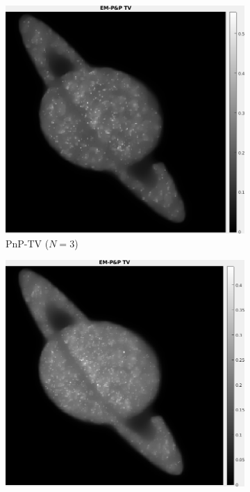 \documentclass[a4paper, 11pt]{article}
\begin{document}
\begin{figure}[h]
\begin{subfigure}[b]{0.22\textwidth}
        \includegraphics[width=\textwidth]{../Figures/PnPReconstructionNoiseSigma1e-3Realization3.png}
        \caption{PnP-TV ($N=3$)}
        \label{fig:PnP-2}
    \end{subfigure}
    \begin{subfigure}[b]{0.22\textwidth}
        \includegraphics[width=\textwidth]{../Figures/PnPReconstructionNoiseSigma1e-3Realization6.png}

\end{subfigure}
\end{figure}
\end{document}
